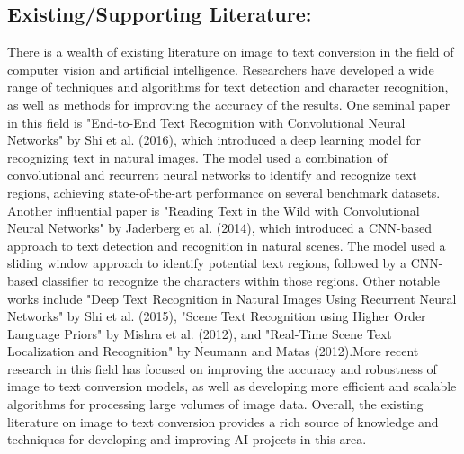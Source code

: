 \subsection{Existing/Supporting Literature:}
There is a wealth of existing literature on image to text conversion in the field of computer vision and artificial intelligence. Researchers have developed a wide range of techniques and algorithms for text detection and character recognition, as well as methods for improving the accuracy of the results. One seminal paper in this field is "End-to-End Text Recognition with Convolutional Neural Networks" by Shi et al. (2016), which introduced a deep learning model for recognizing text in natural images. The model used a combination of convolutional and recurrent neural networks to identify and recognize text regions, achieving state-of-the-art performance on several benchmark datasets. Another influential paper is "Reading Text in the Wild with Convolutional Neural Networks" by Jaderberg et al. (2014), which introduced a CNN-based approach to text detection and recognition in natural scenes. The model used a sliding window approach to identify potential text regions, followed by a CNN-based classifier to recognize the characters within those regions. Other notable works include "Deep Text Recognition in Natural Images Using Recurrent Neural Networks" by Shi et al. (2015), "Scene Text Recognition using Higher Order Language Priors" by Mishra et al. (2012), and "Real-Time Scene Text Localization and Recognition" by Neumann and Matas (2012).More recent research in this field has focused on improving the accuracy and robustness of image to text conversion models, as well as developing more efficient and scalable algorithms for processing large volumes of image data. Overall, the existing literature on image to text conversion provides a rich source of knowledge and techniques for developing and improving AI projects in this area.

